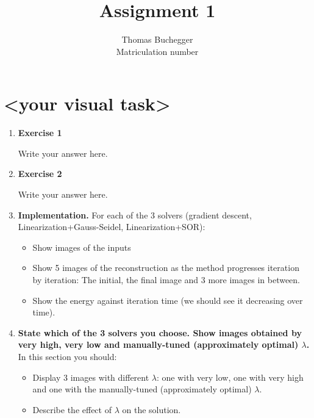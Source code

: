 \documentclass{paper}
\title{Assignment 1}
\author{Thomas Buchegger\\Matriculation number}
\begin{document}
\maketitle


%

\section*{<your visual task>}

\begin{enumerate}
\item \textbf{Exercise 1}

Write your answer here.

\item \textbf{Exercise 2}

Write your answer here.


\item \textbf{Implementation.} For each of the 3 solvers (gradient descent, Linearization+Gauss-Seidel, Linearization+SOR):

\begin{itemize}
\item Show images of the inputs
\item Show 5 images of the reconstruction as the method progresses iteration by iteration: The initial, the final image and 3 more images in between.
\item Show the energy against iteration time (we should see it decreasing over time).
\end{itemize}

\item \textbf{State which of the 3 solvers you choose. Show images obtained by very high, very low and manually-tuned (approximately optimal) $\lambda$.} In this section you should:

\begin{itemize}
\item Display 3 images with different $\lambda$: one with very low, one with very high and one with the manually-tuned (approximately optimal) $\lambda$.
\item Describe the effect of $\lambda$ on the solution.
\end{itemize}


\end{enumerate}
\end{document}
